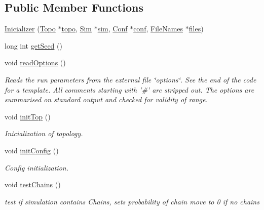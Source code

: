 \subsection*{Public Member Functions}
\begin{DoxyCompactItemize}
\item 
\hyperlink{class_inicializer_aebd47082aeb8e42a1f44edd8a9844fa1}{Inicializer} (\hyperlink{class_topo}{Topo} $\ast$\hyperlink{class_inicializer_a9ce346ffecd5ecf76bd4c1c68a3060f7}{topo}, \hyperlink{class_sim}{Sim} $\ast$\hyperlink{class_inicializer_a8d55514c1121c5d3edbbd4fdfb32db65}{sim}, \hyperlink{class_conf}{Conf} $\ast$\hyperlink{class_inicializer_a6a3bb727f3ad6db5c667f615596cd5e4}{conf}, \hyperlink{struct_file_names}{File\+Names} $\ast$\hyperlink{class_inicializer_aecd4b4dcea44e06dd58000db4144e93e}{files})
\item 
long int \hyperlink{class_inicializer_a8cc93243d56aa21def8f073739f63ad4}{get\+Seed} ()
\item 
void \hyperlink{class_inicializer_a41ac3793bca326b7b0d47c342bebf7b4}{read\+Options} ()
\begin{DoxyCompactList}\small\item\em Reads the run parameters from the external file \char`\"{}options\char`\"{}. See the end of the code for a template. All comments starting with '\#' are stripped out. The options are summarised on standard output and checked for validity of range. \end{DoxyCompactList}\item 
void \hyperlink{class_inicializer_a7e1409d66a770fb50bcd90d96446a917}{init\+Top} ()
\begin{DoxyCompactList}\small\item\em Inicialization of topology. \end{DoxyCompactList}\item 
void \hyperlink{class_inicializer_a03369c6bc8655d42befd4c79f4f02301}{init\+Config} ()
\begin{DoxyCompactList}\small\item\em Config initialization. \end{DoxyCompactList}\item 
void \hyperlink{class_inicializer_a228deba06743d06562179c7f85b958ad}{test\+Chains} ()
\begin{DoxyCompactList}\small\item\em test if simulation contains Chains, sets probability of chain move to 0 if no chains \end{DoxyCompactList}\item 

\end{DoxyCompactItemize}
